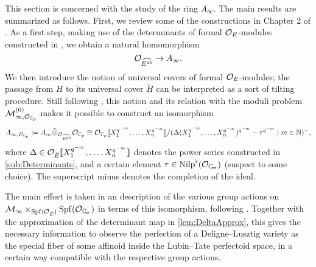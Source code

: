 \documentclass[../main.tex]{subfiles}
\begin{document}
This section is concerned with the study of the ring $A_\infty$. 
The main results are summarized as follows. 
First, we review some of the constructions in Chapter 2 of
\cite{weinstein2016semistable}. As a first step, making use of the determinants
of formal $\mathcal{O}_E$-modules constructed in \cite{hedayatzadeh2015det}, we obtain
a natural homomorphism
\begin{equation*}
   \mathcal{O}_{\widehat{E^{\mathrm{ab}}}} \to  A_\infty.
\end{equation*}
We then introduce the notion of universal covers of formal $\mathcal{O}_E$-modules; the 
passage from $H$ to its universal cover $\tilde H$ can be interpreted as a sort
of tilting procedure. Still following \cite{weinstein2016semistable}, this
notion and its relation with the moduli problem $\mathcal{M}_{\infty,
\mathcal{O}_{\mathbb{C}_p}}^{(0)}$ makes it possible to construct an isomorphism
\begin{equation}\label{eq:ExplicitAinftyBCtoOC}
  A_{\infty, \mathcal{O}_{\mathbb{C}_p}} \coloneq A_\infty \widehat \otimes_{\mathcal{O}_{\widehat{E^{\mathrm{ab}}}}}
  \mathcal{O}_{\mathbb{C}_p} 
  \cong \mathcal{O}_{\mathbb{C}_p} \llbracket X_1^{q^{-\infty}}, \dots, X_n^{q^{-\infty}} \rrbracket /
  (\Delta(X_1^{q^{-\infty}}, \dots, X_n^{q^{-\infty}})^{q^{-m}} - \tau^{q^{-m}} \mid 
  m \in \mathbb{N})^- ,
\end{equation}
where $\Delta \in \mathcal{O}_{{\breve {E}}} \llbracket X_1^{q^{-\infty}}, \dots,
X_n^{q^{-\infty}}\rrbracket$ denotes the power series constructed in 
\cref{sub:Determinants}, and a certain element $\tau \in \Nilp^\flat(\cO_\Cp)$
(suspect to some choice). The superscript minus denotes the completion of the
ideal.

The main effort is taken in an description of the various group actions on
$\cM_\infty \times_{\Spf(\cO_\br E)} \Spf(\cO_\Cp)$ in terms of this
isomorphism, following \cite[ 1.2]{imaitsushima2020affinoids}.
Together with the approximation of the determinant map in 
\cref{lem:DeltaApprox}, this gives the necessary information to observe the
perfection of a Deligne--Lusztig variety as the special fiber of some affinoid
inside the Lubin--Tate perfectoid space, in a certain way compatible with the
respective group actions. 

\end{document}
